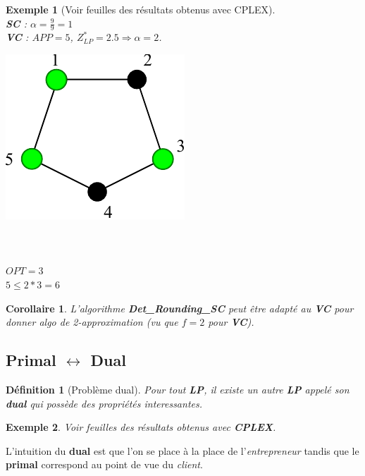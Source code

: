 \documentclass{article}
\newcommand{\titre}[1]{\textcolor{title}{#1}}
\newtheorem{de}{D\'efinition}[section]
\newtheorem{exemple}{Exemple}[section]
\newtheorem{corollaire}{Corollaire}[section]
\begin{document}
\begin{sffamily}
\begin{exemple}[Voir feuilles des résultats obtenus avec CPLEX]$ $\\
\textbf{\titre{SC}} : $\alpha = \frac{9}{9} = 1$ \\
\textbf{\titre{VC}} : $APP = 5$, $Z^*_{LP} = 2.5 \Rightarrow \alpha = 2$. \\
\begin{multicols}{2}
\includegraphics[scale=1]{vcSol.pdf}
$ $\\$ $\\$ $\\$ $\\
$OPT = 3$\\
$5 \leq 2*3=6$
\end{multicols}
\end{exemple}

\begin{corollaire}
L'algorithme \textbf{Det\_Rounding\_SC} peut être adapté au \textbf{\titre{VC}} pour donner algo de 2-approximation (vu que $f = 2$ pour
\textbf{\titre{VC}}).
\end{corollaire}

\subsection{Primal $\leftrightarrow$ Dual}

\begin{de}[Problème dual]
Pour tout \textbf{\titre{LP}}, il existe un autre \textbf{\titre{LP}} appelé son \textbf{dual} qui possède des propriétés interessantes.
\end{de}

\begin{exemple}Voir feuilles des résultats obtenus avec \textbf{CPLEX}.\end{exemple}

L'intuition du \textbf{dual} est que l'on se place à la place de l'\textit{entrepreneur} tandis que le \textbf{primal} correspond au
point de vue du \textit{client}. \\


\end{sffamily}
\end{document}
